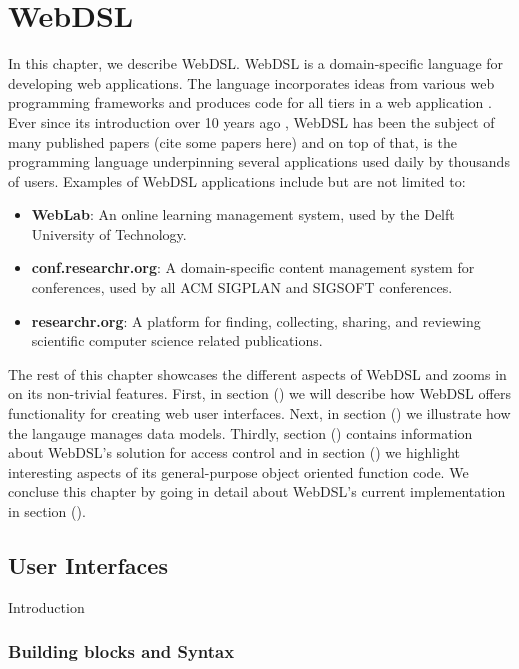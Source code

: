 
\chapter{\label{chap:webdsl}WebDSL}

  In this chapter, we describe WebDSL. WebDSL is a domain-specific language for developing web applications. The language incorporates ideas from various web programming frameworks and produces code for all tiers in a web application \autocite{Groenewegen2020}. Ever since its introduction over 10 years ago \autocite{Visser07}, WebDSL has been the subject of many published papers (cite some papers here) and on top of that, is the programming language underpinning several applications used daily by thousands of users. Examples of WebDSL applications include but are not limited to:
  \begin{itemize}
    \item \textbf{WebLab}: An online learning management system, used by the Delft University of Technology.
    \item \textbf{conf.researchr.org}: A domain-specific content management system for conferences, used by all ACM SIGPLAN and SIGSOFT conferences.
    \item \textbf{researchr.org}: A platform for finding, collecting, sharing, and reviewing scientific computer science related publications.
  \end{itemize}

  The rest of this chapter showcases the different aspects of WebDSL and zooms in on its non-trivial features. First, in section () we will describe how WebDSL offers functionality for creating web user interfaces. Next, in section () we illustrate how the langauge manages data models. Thirdly, section () contains information about WebDSL's solution for access control and in section () we highlight interesting aspects of its general-purpose object oriented function code. We concluse this chapter by going in detail about WebDSL's current implementation in section ().

  \section{User Interfaces}

    Introduction

    \subsection{Building blocks and Syntax}

